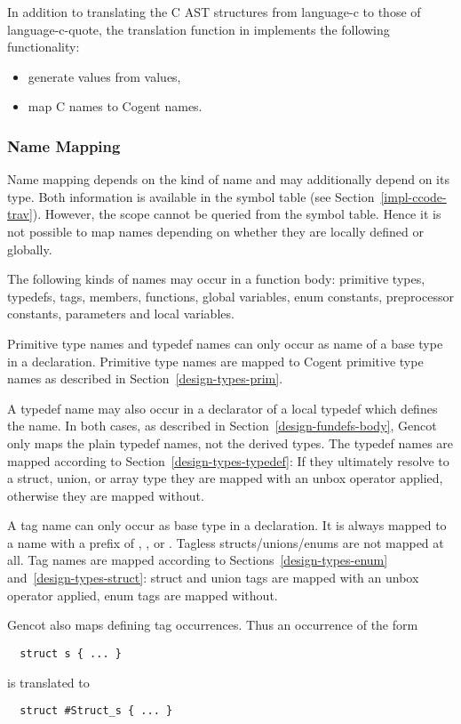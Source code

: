 In addition to translating the C AST structures from language-c to those of language-c-quote, the translation
function in  implements the following functionality:
\begin{itemize}
\item generate  values from  values,
\item map C names to Cogent names.
\end{itemize}

\subsubsection{Name Mapping}

Name mapping depends on the kind of name and may additionally depend on its type. Both information is
available in the symbol table (see Section~\ref{impl-ccode-trav}). However, the scope cannot be queried
from the symbol table. Hence it is not possible to map names depending on whether they are locally defined
or globally.

The following kinds of names may occur in a function body: primitive types, typedefs, tags, members, 
functions, global variables, enum constants, preprocessor constants, parameters and local variables.

Primitive type names and typedef names can only occur as name of a base type in a declaration. Primitive
type names are mapped to Cogent primitive type names as described in Section~\ref{design-types-prim}.

A typedef name may also occur in a declarator of a local typedef which defines the name. 
In both cases, as described in Section~\ref{design-fundefs-body}, Gencot
only maps the plain typedef names, not the derived types. The typedef names are mapped according to
Section~\ref{design-types-typedef}: If they ultimately resolve to a struct, union, or array type they
are mapped with an unbox operator applied, otherwise they are mapped without.

A tag name can only occur as base type in a declaration. It is always mapped to a name with a prefix 
of , , or . Tagless structs/unions/enums are not mapped at all.
Tag names are mapped according to Sections~\ref{design-types-enum} and~\ref{design-types-struct}: struct
and union tags are mapped with an unbox operator applied, enum tags are mapped without.

Gencot also maps defining tag occurrences. Thus an occurrence of the form 
\begin{verbatim}
  struct s { ... }
\end{verbatim}
is translated to
\begin{verbatim}
  struct #Struct_s { ... }
\end{verbatim}

